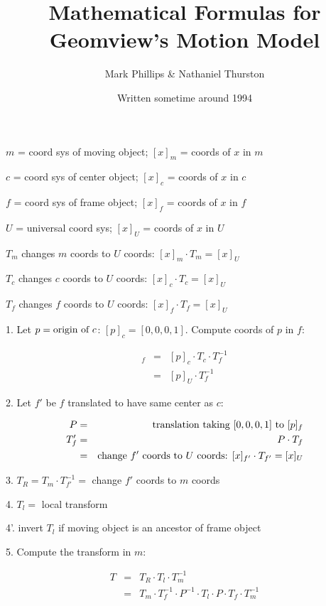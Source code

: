 \documentclass{article}
\title{Mathematical Formulas for Geomview's Motion Model}
\author{Mark Phillips \& Nathaniel Thurston}
\date{Written sometime around 1994}
\begin{document}
\maketitle

$m$ = coord sys of moving object; $[x]_m$ = coords of $x$ in $m$

$c$ = coord sys of center object; $[x]_c$ = coords of $x$ in $c$

$f$ = coord sys of frame object; $[x]_f$ = coords of $x$ in $f$

$U$ = universal coord sys; $[x]_U$ = coords of $x$ in $U$

\smallskip

$T_m$ changes $m$ coords to $U$ coords: $[x]_m \cdot T_m = [x]_U$

$T_c$ changes $c$ coords to $U$ coords: $[x]_c \cdot T_c = [x]_U$

$T_f$ changes $f$ coords to $U$ coords: $[x]_f \cdot T_f = [x]_U$

\begin{description}

\item{1.}
Let $p = \hbox{origin of } c$: $[p]_c = [0,0,0,1]$.
Compute coords of $p$ in $f$:

\begin{eqnarray}
   [p]_f & = & [p]_c \cdot T_c \cdot T_{f}^{-1} \\
         & = & [p]_U           \cdot T_{f}^{-1}
\end{eqnarray}

\item{2.}
Let $f'$ be $f$ translated to have same center as $c$:

\begin{eqnarray}
   P & = & \hbox{translation taking } [0,0,0,1] \hbox{ to } [p]_f \\
   T'_f & = & P \cdot T_f \\
        & = & \hbox{change } f' \hbox{ coords to } U \hbox{ coords: }
[x]_{f'} \cdot T_{f'} = [x]_U
\end{eqnarray}

\item{3.}
$T_R = T_m \cdot T_{f'}^{-1} = $ change $f'$ coords to $m$ coords

\item{4.}
$T_l = $ local transform

\item{4'.}
invert $T_l$ if moving object is an ancestor of frame object

\item{5.}
Compute the transform in $m$:

\begin{eqnarray}
T & = & T_R \cdot T_l \cdot T_{m}^{-1} \\
  & = & T_m \cdot T_f^{-1} \cdot P^{-1} \cdot T_l \cdot P \cdot T_f
        \cdot T_m^{-1}
\end{eqnarray}

\end{description}
\end{document}
